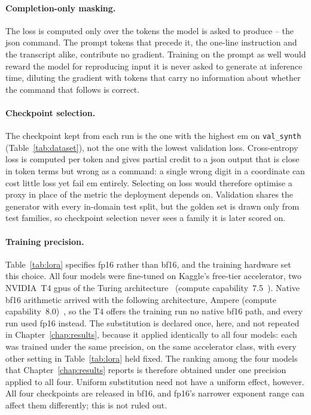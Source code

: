\paragraph{Completion-only masking.} \enlargethispage{\baselineskip}The loss is computed only over the tokens the model is asked
to produce -- the \gls{json} command. The prompt tokens that precede it, the one-line instruction
and the transcript alike, contribute no gradient. Training on the prompt as well would reward the
model for reproducing input it is never asked to generate at inference time, diluting the gradient
with tokens that carry no information about whether the command that follows is correct.

\paragraph{Checkpoint selection.} The checkpoint kept from each run is the one with the highest
\gls{em} on \texttt{val\_synth} (Table~\ref{tab:dataset}), not the one with the lowest
validation loss. Cross-entropy loss is computed per token and gives partial credit to a \gls{json}
output that is close in token terms but wrong as a command: a single wrong digit in a coordinate can
cost little loss yet fail \gls{em} entirely. Selecting on loss would therefore optimise a proxy
in place of the metric the deployment depends on. Validation shares the generator with every
in-domain test split, but the golden set is drawn only from test families, so checkpoint selection
never sees a family it is later scored on.

\paragraph{Training precision.} Table~\ref{tab:lora} specifies fp16 rather than bf16, and the
training hardware set this choice. All four models were fine-tuned on Kaggle's free-tier
accelerator, two NVIDIA~T4 \glspl{gpu} of the Turing architecture~\cite{nvidiat4} (compute
capability~7.5~\cite{nvidiacc}). Native bf16 arithmetic arrived with the following architecture,
Ampere (compute capability~8.0)~\cite{nvidiaampere}, so the T4 offers the training run no native
bf16 path, and every run used fp16 instead. The substitution is declared once, here, and not repeated in
Chapter~\ref{chap:results}, because it applied identically to all four models: each was trained
under the same precision, on the same accelerator class, with every other setting in
Table~\ref{tab:lora} held fixed. The ranking among the four models that Chapter~\ref{chap:results}
reports is therefore obtained under one precision applied to all four. Uniform substitution need
not have a uniform effect, however. All four checkpoints are released in bf16, and fp16's narrower
exponent range can affect them differently; this is not ruled out.

